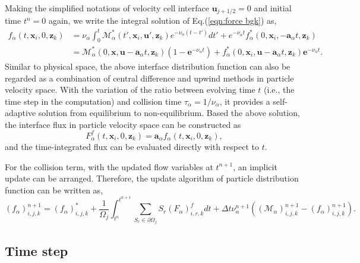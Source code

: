\documentclass[preprint,3p,12pt,sort&compress]{elsarticle}
\begin{document}
Making the simplified notations of velocity cell interface $\mathbf u_{j+1/2}=0$ and initial time $t^n=0$ again, we write the integral solution of Eq.(\ref{eqn:force bgk}) as,
\begin{equation}
\begin{aligned}
f_\alpha(t,\mathbf x_i,0,\mathbf z_k)
&=\nu_\alpha \int_{0}^{t} \mathcal M^*_\alpha(t',\mathbf x_i,\mathbf u',\mathbf z_k)e^{-\nu_\alpha (t-t')}dt' +e^{-\nu_\alpha t} f^*_\alpha(0,\mathbf x_i,-\mathbf a_\alpha t,\mathbf z_k) \\
&=\mathcal M^*_\alpha(0,\mathbf{x}, \mathbf{u}-\mathbf a_\alpha t,\mathbf z_k)\left(1-\mathbf{e}^{-\nu_\alpha t}\right)+f^*_{\alpha}(0,\mathbf{x}_i, \mathbf{u}-\mathbf a_\alpha t,\mathbf z_k) \mathbf{e}^{-\nu_\alpha t}.
\end{aligned}
\label{eqn:velocity interface distribution}
\end{equation}
Similar to physical space, the above interface distribution function can also be regarded as a combination of central difference and upwind methods in particle velocity space.
With the variation of the ratio between evolving time $t$ (i.e., the time step in the computation) and collision time $\tau_\alpha=1/\nu_\alpha$, it provides a self-adaptive solution from equilibrium to non-equilibrium. 
Based the above solution, the interface flux in particle velocity space can be constructed as
\begin{equation}
{{F}}_{\alpha}^f(t,\mathbf x_i,0,\mathbf z_k)= \mathbf a_\alpha f_{\alpha}(t,\mathbf x_i,0,\mathbf z_k),
\end{equation}
and the time-integrated flux can be evaluated directly with respect to $t$.

For the collision term, with the updated flow variables at $t^{n+1}$, an implicit update can be arranged. 
Therefore, the update algorithm of particle distribution function can be written as,
\begin{equation}
\left(f_{\alpha}\right)_{i, j, k}^{n+1}
=\left(f_{\alpha}\right)_{i, j, k}^{*}
+\frac{1}{\Omega_{j}} \int_{t^{n}}^{t^{n+1}} \sum_{S_{r} \in \partial \Omega_{j}} S_{r}\left(F_{\alpha}\right)_{i,r,k}^{f} d t
+\Delta t \nu_\alpha^{n+1} \left( (\mathcal M_\alpha)_{i,j,k}^{n+1} - (f_\alpha)_{i,j,k}^{n+1} \right).
\end{equation}

\subsection{Time step}
\end{document}
